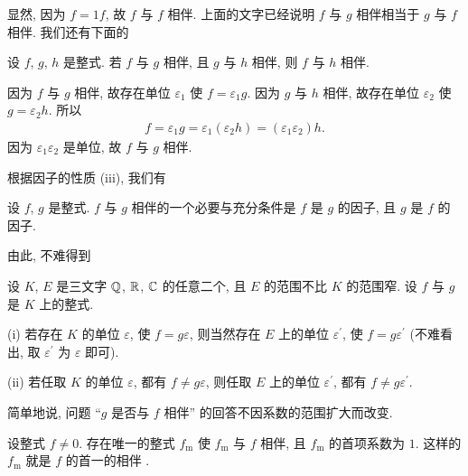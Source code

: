 显然, 因为 $f = 1f$, 故 $f$ 与 $f$ 相伴. 上面的文字已经说明 $f$ 与 $g$ 相伴相当于 $g$ 与 $f$ 相伴. 我们还有下面的
\begin{proposition}
    设 $f$, $g$, $h$ 是整式. 若 $f$ 与 $g$ 相伴, 且 $g$ 与 $h$ 相伴, 则 $f$ 与 $h$ 相伴.
\end{proposition}

\begin{pf}
    因为 $f$ 与 $g$ 相伴, 故存在单位 $\varepsilon_1$ 使 $f = \varepsilon_1 g$. 因为 $g$ 与 $h$ 相伴, 故存在单位 $\varepsilon_2$ 使 $g = \varepsilon_2 h$. 所以
    \begin{align*}
        f = \varepsilon_1 g = \varepsilon_1 (\varepsilon_2 h) = (\varepsilon_1 \varepsilon_2) h.
    \end{align*}
    因为 $\varepsilon_1 \varepsilon_2$ 是单位, 故 $f$ 与 $g$ 相伴.
\end{pf}

根据因子的性质 (iii), 我们有
\begin{proposition}
    设 $f$, $g$ 是整式. $f$ 与 $g$ 相伴的一个必要与充分条件是 $f$ 是 $g$ 的因子, 且 $g$ 是 $f$ 的因子.
\end{proposition}

由此, 不难得到
\begin{proposition}
    设 $K$, $E$ 是三文字 $\mathbb{Q}$, $\mathbb{R}$, $\mathbb{C}$ 的任意二个, 且 $E$ 的范围不比 $K$ 的范围窄. 设 $f$ 与 $g$ 是 $K$ 上的整式.

    (i) 若存在 $K$ 的单位 $\varepsilon$, 使 $f = g\varepsilon$, 则当然存在 $E$ 上的单位 $\varepsilon^{\prime}$, 使 $f = g\varepsilon^{\prime}$ (不难看出, 取 $\varepsilon^{\prime}$ 为 $\varepsilon$ 即可).

    (ii) 若任取 $K$ 的单位 $\varepsilon$, 都有 $f \neq g\varepsilon$, 则任取 $E$ 上的单位 $\varepsilon^{\prime}$, 都有 $f \neq g\varepsilon^{\prime}$.

    简单地说, 问题 ``$g$ 是否与 $f$ 相伴'' 的回答不因系数的范围扩大而改变.
\end{proposition}

\begin{proposition}
    设整式 $f \neq 0$. 存在唯一的整式 $f_\mathrm{m}$ 使 $f_\mathrm{m}$ 与 $f$ 相伴, 且 $f_\mathrm{m}$ 的首项系数为 $1$. 这样的 $f_\mathrm{m}$ 就是 $f$ 的首一的相伴 .
\end{proposition}

